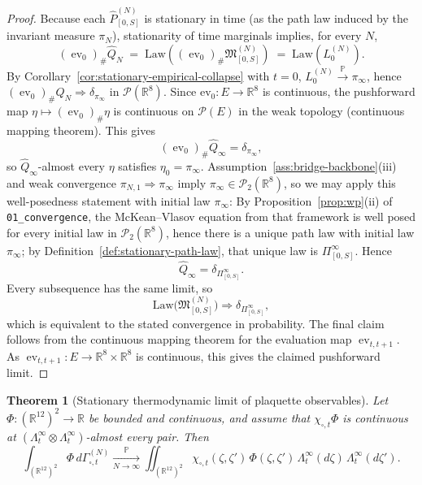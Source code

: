 \documentclass[11pt]{article}
\newtheorem{theorem}{Theorem}[section]
\theoremstyle{definition}
\theoremstyle{remark}
\newcommand{\R}{\mathbb R}
\newcommand{\Law}{\mathrm{Law}}
\newcommand{\mcP}{\mathcal P}
\begin{document}
\begin{proof}
Because each \(\widehat P_{[0,S]}^{(N)}\) is stationary in time (as the path
law induced by the invariant measure \(\pi_N\)), stationarity of time marginals
implies, for every \(N\),
\[
(\operatorname{ev}_0)_\#\widehat Q_N
\;=\;
\Law\!\left((\operatorname{ev}_0)_\#\mathfrak M_{[0,S]}^{(N)}\right)
\;=\;
\Law(L_0^{(N)}).
\]
By Corollary~\ref{cor:stationary-empirical-collapse} with \(t=0\),
\(L_0^{(N)}\xrightarrow{\mathbb P}\pi_\infty\), hence
\((\operatorname{ev}_0)_\#\widehat Q_N\Rightarrow\delta_{\pi_\infty}\)
in \(\mcP(\R^8)\). Since \(\mathrm{ev}_0:E\to\R^8\) is continuous, the
pushforward map \(\eta\mapsto(\operatorname{ev}_0)_\#\eta\) is continuous on
\(\mcP(E)\) in the weak topology (continuous mapping theorem). This gives
\[
(\operatorname{ev}_0)_\#\widehat Q_\infty=\delta_{\pi_\infty},
\]
so \(\widehat Q_\infty\)-almost every \(\eta\) satisfies \(\eta_0=\pi_\infty\).
Assumption~\ref{ass:bridge-backbone}(iii) and weak convergence
\(\pi_{N,1}\Rightarrow\pi_\infty\) imply \(\pi_\infty\in\mcP_2(\R^8)\), so
we may apply this well-posedness statement with initial law \(\pi_\infty\):
By Proposition~\ref{prop:wp}(ii) of \texttt{01\_convergence}, the McKean--Vlasov
equation from that framework is well posed for every initial law in
\(\mcP_2(\R^8)\), hence there is a unique path law with initial law
\(\pi_\infty\); by Definition~\ref{def:stationary-path-law}, that unique law is
\(\Pi_{[0,S]}^\infty\).
Hence
\[
\widehat Q_\infty=\delta_{\Pi_{[0,S]}^\infty}.
\]
Every subsequence has the same limit, so
\[
\Law\!\bigl(\mathfrak M_{[0,S]}^{(N)}\bigr)
\Rightarrow
\delta_{\Pi_{[0,S]}^\infty},
\]
which is equivalent to the stated convergence in probability.
The final claim follows from the continuous mapping theorem for the evaluation
map \(\operatorname{ev}_{t,t+1}\). As \(\operatorname{ev}_{t,t+1}:E\to
\R^8\times\R^8\) is continuous, this gives the claimed pushforward limit.
\end{proof}

\begin{theorem}[Stationary thermodynamic limit of plaquette observables]
\label{thm:plaquette-measure-limit}
Let \(\Phi:(\R^{12})^2\to\R\) be bounded and continuous, and assume that
\(\chi_{\square,t}\Phi\) is continuous at
\((\Lambda_t^\infty\otimes\Lambda_t^\infty)\)-almost every pair.
Then
\[
\int_{(\R^{12})^2}\Phi\,d\Gamma_{\square,t}^{(N)}
\xrightarrow[N\to\infty]{\mathbb P}
\iint_{(\R^{12})^2}
\chi_{\square,t}(\zeta,\zeta')\,\Phi(\zeta,\zeta')\,
\Lambda_t^\infty(d\zeta)\,\Lambda_t^\infty(d\zeta').
\]
\end{theorem}
\end{document}
